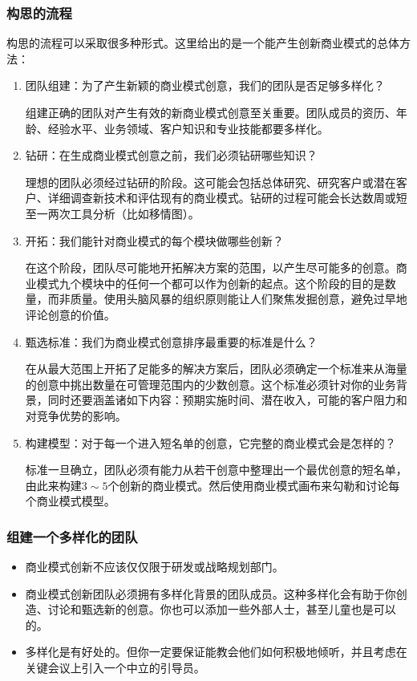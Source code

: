 \subsubsection{构思的流程}
构思的流程可以采取很多种形式。这里给出的是一个能产生创新商业模式的总体方法：
\begin{enumerate}[label=\arabic*.]
    \item 团队组建：为了产生新颖的商业模式创意，我们的团队是否足够多样化？
    
    组建正确的团队对产生有效的新商业模式创意至关重要。团队成员的资历、年龄、经验水平、业务领域、客户知识和专业技能都要多样化。
    \item 钻研：在生成商业模式创意之前，我们必须钻研哪些知识？
    
    理想的团队必须经过钻研的阶段。这可能会包括总体研究、研究客户或潜在客户、详细调查新技术和评估现有的商业模式。钻研的过程可能会长达数周或短至一两次工具分析（比如移情图）。
    \item 开拓：我们能针对商业模式的每个模块做哪些创新？
    
    在这个阶段，团队尽可能地开拓解决方案的范围，以产生尽可能多的创意。商业模式九个模块中的任何一个都可以作为创新的起点。这个阶段的目的是数量，而非质量。使用头脑风暴的组织原则能让人们聚焦发掘创意，避免过早地评论创意的价值。
    \item 甄选标准：我们为商业模式创意排序最重要的标准是什么？
    
    在从最大范围上开拓了足能多的解决方案后，团队必须确定一个标准来从海量的创意中挑出数量在可管理范围内的少数创意。这个标准必须针对你的业务背景，同时还要涵盖诸如下内容：预期实施时间、潜在收入，可能的客户阻力和对竞争优势的影响。
    \item 构建模型：对于每一个进入短名单的创意，它完整的商业模式会是怎样的？
    
    标准一旦确立，团队必须有能力从若干创意中整理出一个最优创意的短名单，由此来构建$3\sim 5$个创新的商业模式。然后使用商业模式画布来勾勒和讨论每个商业模式模型。
\end{enumerate}

\subsubsection{组建一个多样化的团队}

\begin{itemize}
    \item 商业模式创新不应该仅仅限于研发或战略规划部门。
    \item 商业模式创新团队必须拥有多样化背景的团队成员。这种多样化会有助于你创造、讨论和甄选新的创意。你也可以添加一些外部人士，甚至儿童也是可以的。
    \item 多样化是有好处的。但你一定要保证能教会他们如何积极地倾听，并且考虑在关键会议上引入一个中立的引导员。
\end{itemize}

